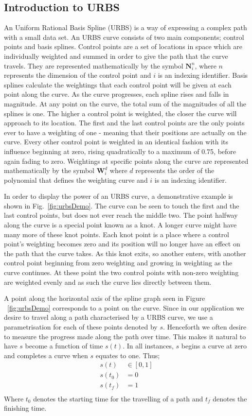 \subsection{Introduction to URBS}
An Uniform Rational Basis Spline (URBS) is a way of expressing a complex path with a small data set. An URBS curve consists of two main components; control points and basis splines.
Control points are a set of locations in space which are individually weighted and summed in order to give the path that the curve travels. They are represented mathematically by the symbol $\textbf{N}^n_i$, where $n$ represents the dimension of the control point and $i$ is an indexing identifier.
Basis splines calculate the weightings that each control point will be given at each point along the curve. As the curve progresses, each spline rises and falls in magnitude. At any point on the curve, the total sum of the magnitudes of all the splines is one.
The higher a control point is weighted, the closer the curve will approach to its location. The first and the last control points are the only points ever to have a weighting of one - meaning that their positions are actually on the curve. Every other control point is weighted in an identical fashion with its influence beginning at zero, rising quadratically to a maximum of 0.75, before again fading to zero. Weightings at specific points along the curve are represented mathematically by the symbol $\textbf{W}_i^d$ where $d$ represents the order of the polynomial that defines the weighting curve and $i$ is an indexing identifier.

In order to display the power of an URBS curve, a demonstrative example is shown in Fig.~\ref{fig:urbsDemo}. The curve can be seen to touch the first and the last control points, but does not ever reach the middle two. The point halfway along the curve is a special point known as a 
knot. A longer curve might have many more of these knot points. Each knot point is a place where a control point's weighting becomes zero and its position will no longer have an effect on the path that the curve takes. As this knot exits, so another enters, with another control point beginning from zero weighting and growing in weighting as the curve continues. At these point the two control points with non-zero weighting are weighted evenly and as such the curve lies directly between them.

A point along the horizontal axis of the spline graph seen in Figure ~\ref{fig:urbsDemo} corresponds to a point on the curve. Since in our application we desire to travel along a path characterised by a URBS curve, we use a parametrisation for each of these points denoted by $s$. Henceforth we often desire to measure the progress made along the path over time. This makes it natural to have $s$ become a function of time $s(t)$. In all instances, $s$ begins a curve at zero and completes a curve when $s$ equates to one. Thus;
\begin{align*}
s(t) &\in [0,1]\\
s(t_0) &= 0\\
s(t_f) &= 1\\
\end{align*}
Where $t_0$ denotes the starting time for the travelling of a path and $t_f$ denotes the finishing time.


